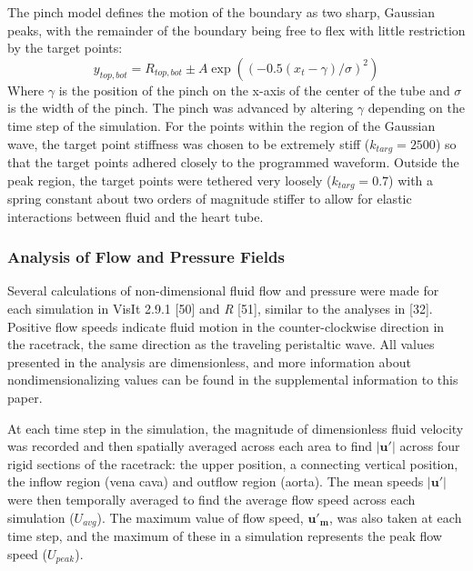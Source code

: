 \documentclass[
]{article}
\begin{document}
The pinch model defines the motion of the boundary as two sharp,
Gaussian peaks, with the remainder of the boundary being free to flex
with little restriction by the target points: \begin{equation}
y_{top,bot} = R_{top,bot} \pm A\exp((-0.5(x_t-\gamma)/\sigma)^2)
\label{eq:gaussianwaves}
\end{equation} Where \(\gamma\) is the position of the pinch on the
x-axis of the center of the tube and \(\sigma\) is the width of the
pinch. The pinch was advanced by altering \(\gamma\) depending on the
time step of the simulation. For the points within the region of the
Gaussian wave, the target point stiffness was chosen to be extremely
stiff (\(k_{targ}=2500\)) so that the target points adhered closely to
the programmed waveform. Outside the peak region, the target points were
tethered very loosely (\(k_{targ}=0.7\)) with a spring constant about
two orders of magnitude stiffer to allow for elastic interactions
between fluid and the heart tube.

\hypertarget{analysis-of-flow-and-pressure-fields}{%
\subsubsection{Analysis of Flow and Pressure
Fields}\label{analysis-of-flow-and-pressure-fields}}

Several calculations of non-dimensional fluid flow and pressure were
made for each simulation in VisIt 2.9.1 {[}50{]} and \emph{R} {[}51{]},
similar to the analyses in {[}32{]}. Positive flow speeds indicate fluid
motion in the counter-clockwise direction in the racetrack, the same
direction as the traveling peristaltic wave. All values presented in the
analysis are dimensionless, and more information about
nondimensionalizing values can be found in the supplemental information
to this paper.

At each time step in the simulation, the magnitude of dimensionless
fluid velocity was recorded and then spatially averaged across each area
to find \(|\mathbf{u'}|\) across four rigid sections of the racetrack:
the upper position, a connecting vertical position, the inflow region
(vena cava) and outflow region (aorta). The mean speeds
\(|\mathbf{u'}|\) were then temporally averaged to find the average flow
speed across each simulation (\(U_{avg}\)). The maximum value of flow
speed, \(\mathbf{u'_{m}}\), was also taken at each time step, and the
maximum of these in a simulation represents the peak flow speed
(\(U_{peak}\)).
\end{document}
